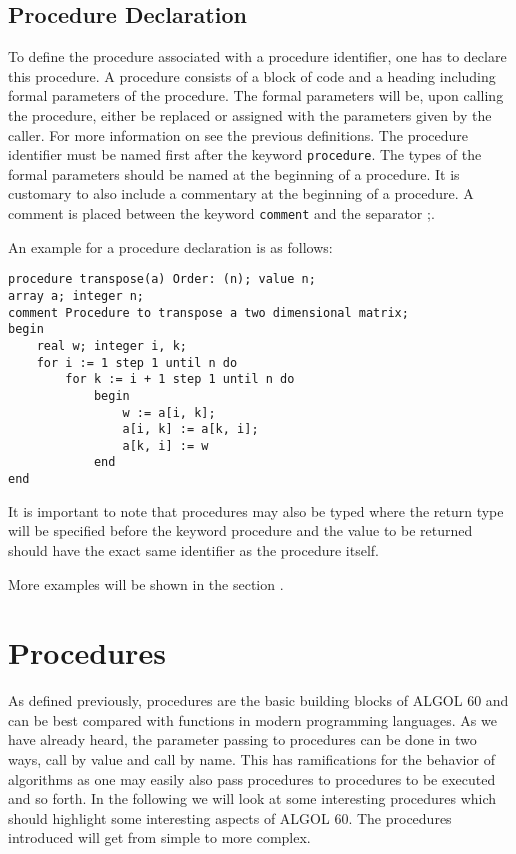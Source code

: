 \documentclass{article}
\begin{document}
\subsection{Procedure Declaration} \label{procDecl}
To define the procedure associated with a procedure identifier, one has to declare this procedure. A procedure consists of a block of code and a heading including formal parameters of the procedure. The formal parameters will be, upon calling the procedure, either be replaced or assigned with the parameters given by the caller. For more information on  see the previous definitions. The procedure identifier must be named first after the keyword \texttt{procedure}. The types of the formal parameters should be named at the beginning of a procedure. It is customary to also include a commentary at the beginning of a procedure. A comment is placed between the keyword \texttt{comment} and the separator ;.

An example for a procedure declaration is as follows:\\ 
\begin{lstlisting}[language={[60]algol}]
procedure transpose(a) Order: (n); value n;
array a; integer n;
comment Procedure to transpose a two dimensional matrix;
begin
    real w; integer i, k;
    for i := 1 step 1 until n do
        for k := i + 1 step 1 until n do
            begin
                w := a[i, k];
                a[i, k] := a[k, i];
                a[k, i] := w
            end
end
\end{lstlisting}

It is important to note that procedures may also be typed where the return type will be specified before the keyword procedure and the value to be returned should have the exact same identifier as the procedure itself.

More examples will be shown in the section .

\newpage

\section{Procedures} \label{procedures}
As defined previously, procedures are the basic building blocks of ALGOL 60 and can be best compared with functions in modern programming languages. As we have already heard, the parameter passing to procedures can be done in two ways, call by value and call by name. This has ramifications for the behavior of algorithms as one may easily also pass procedures to procedures to be executed and so forth. In the following we will look at some interesting procedures which should highlight some interesting aspects of ALGOL 60. The procedures introduced will get from simple to more complex. \\
\end{document}
